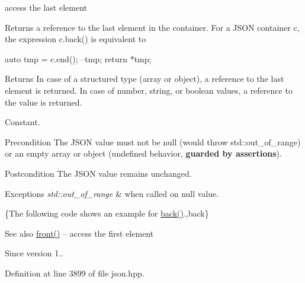 access the last element 

Returns a reference to the last element in the container. For a J\+S\+O\+N container {\ttfamily c}, the expression {\ttfamily c.\+back()} is equivalent to 
\begin{DoxyCode}
\textcolor{keyword}{auto} tmp = c.end();
--tmp;
\textcolor{keywordflow}{return} *tmp;
\end{DoxyCode}


\begin{DoxyReturn}{Returns}
In case of a structured type (array or object), a reference to the last element is returned. In case of number, string, or boolean values, a reference to the value is returned.
\end{DoxyReturn}
Constant.

\begin{DoxyPrecond}{Precondition}
The J\+S\+O\+N value must not be {\ttfamily null} (would throw {\ttfamily std\+::out\+\_\+of\+\_\+range}) or an empty array or object (undefined behavior, {\bfseries guarded by assertions}). 
\end{DoxyPrecond}
\begin{DoxyPostcond}{Postcondition}
The J\+S\+O\+N value remains unchanged.
\end{DoxyPostcond}

\begin{DoxyExceptions}{Exceptions}
{\em std\+::out\+\_\+of\+\_\+range} & when called on {\ttfamily null} value.\\
\hline
\end{DoxyExceptions}
\{The following code shows an example for {\ttfamily \hyperlink{classnlohmann_1_1basic__json_a71b1d38ef402dfee58fba1fe01fa67f5}{back()}}.,back\}

\begin{DoxySeeAlso}{See also}
\hyperlink{classnlohmann_1_1basic__json_aa45753034bea87f9d2c0c42ace9ff75c}{front()} -- access the first element
\end{DoxySeeAlso}
\begin{DoxySince}{Since}
version 1.. 
\end{DoxySince}


Definition at line 3899 of file json.\+hpp.

\hypertarget{classnlohmann_1_1basic__json_a098482190447461f47f80b99bf2519f6}{}
